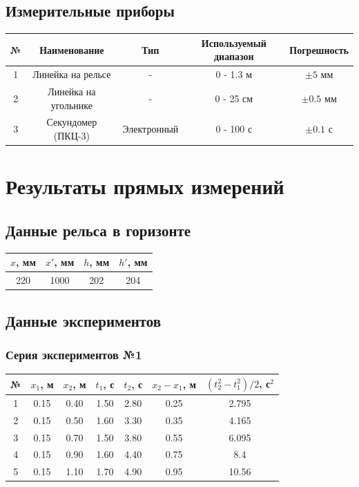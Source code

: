 \documentclass[12pt,a4paper]{article}
\begin{document}
\subsection{Измерительные приборы}
\begin{tabular}{|c|c|c|c|c|}
    \hline
    № & Наименование & Тип & Используемый диапазон & Погрешность \\
    \hline
    1 & Линейка на рельсе & - & 0 - 1.3 м & $\pm 5$ мм \\
    \hline
    2 & Линейка на угольнике & - & 0 - 25 см & $\pm 0.5$ мм \\
    \hline
    3 & Секундомер (ПКЦ-3) & Электронный & 0 - 100 с & $\pm 0.1$ с \\
    \hline
\end{tabular}
\section{Результаты прямых измерений}
\subsection{Данные рельса в горизонте}
\begin{tabular}{|c|c|c|c|}
    \hline
    $x$, мм & $x'$, мм & $h$, мм & $h'$, мм \\
    \hline
    220 & 1000 & 202 & 204 \\
    \hline
\end{tabular}
\subsection{Данные экспериментов}
\subsubsection*{Серия экспериментов №1}
\begin{tabular}{|c|c|c|c|c|c|c|}
    \hline
    № & $x_1$, м & $x_2$, м & $t_1$, с & $t_2$, с & $x_2 - x_1$, м & $(t_2^2-t_1^2) / 2$, с$^2$ \\
    \hline
    1 & 0.15 & 0.40 & 1.50 & 2.80 & 0.25 & 2.795 \\
    \hline
    2 & 0.15 & 0.50 & 1.60 & 3.30 & 0.35 & 4.165 \\
    \hline
    3 & 0.15 & 0.70 & 1.50 & 3.80 & 0.55 & 6.095 \\
    \hline
    4 & 0.15 & 0.90 & 1.60 & 4.40 & 0.75 & 8.4   \\
    \hline
    5 & 0.15 & 1.10 & 1.70 & 4.90 & 0.95 & 10.56 \\
    \hline
\end{tabular}
\end{document}
